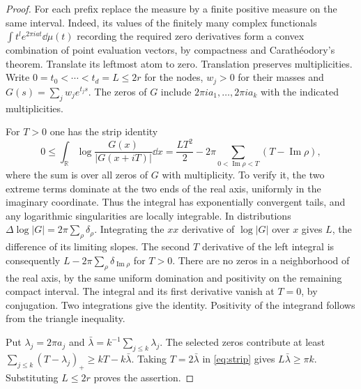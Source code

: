 \documentclass[11pt]{article}
\newcommand{\R}{\mathbb R}\newcommand{\Z}{\mathbb Z}
\begin{document}
\begin{proof}
For each prefix replace the measure by a finite positive measure on the same interval. Indeed, its values of the finitely many complex functionals $\int t^l e^{2\pi iat}\dd\mu(t)$ recording the required zero derivatives form a convex combination of point evaluation vectors, by compactness and Carath\'eodory's theorem. Translate its leftmost atom to zero. Translation preserves multiplicities. Write $0=t_0<\cdots<t_d=L\le2r$ for the nodes, $w_j>0$ for their masses and $G(s)=\sum_j w_j e^{t_j s}$. The zeros of $G$ include $2\pi i a_1,\dots,2\pi i a_k$ with the indicated multiplicities.

For $T>0$ one has the strip identity
\begin{equation}\label{eq:strip}
 0\le \int_{\R}\log\frac{G(x)}{|G(x+iT)|}\dd x
    = \frac{LT^2}{2}-2\pi\sum_{0<\operatorname{Im}\rho<T}(T-\operatorname{Im}\rho),
\end{equation}
where the sum is over all zeros of $G$ with multiplicity. To verify it, the two extreme terms dominate at the two ends of the real axis, uniformly in the imaginary coordinate. Thus the integral has exponentially convergent tails, and any logarithmic singularities are locally integrable. In distributions $\Delta\log|G|=2\pi\sum_\rho\delta_\rho$. Integrating the $xx$ derivative of $\log|G|$ over $x$ gives $L$, the difference of its limiting slopes. The second $T$ derivative of the left integral is consequently $L-2\pi\sum_\rho\delta_{\operatorname{Im}\rho}$ for $T>0$. There are no zeros in a neighborhood of the real axis, by the same uniform domination and positivity on the remaining compact interval. The integral and its first derivative vanish at $T=0$, by conjugation. Two integrations give the identity. Positivity of the integrand follows from the triangle inequality.

Put $\lambda_j=2\pi a_j$ and $\bar\lambda=k^{-1}\sum_{j\le k}\lambda_j$. The selected zeros contribute at least $\sum_{j\le k}(T-\lambda_j)_+\ge kT-k\bar\lambda$. Taking $T=2\bar\lambda$ in \eqref{eq:strip} gives $L\bar\lambda\ge\pi k$. Substituting $L\le2r$ proves the assertion.
\end{proof}
\end{document}
